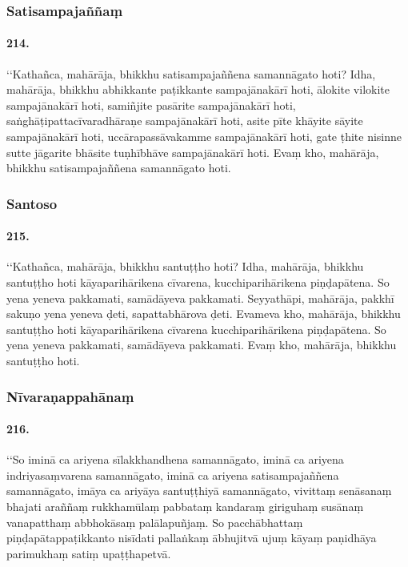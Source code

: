 \subsubsection{Satisampajaññaṃ}

\paragraph{214.} ‘‘Kathañca, mahārāja, bhikkhu satisampajaññena samannāgato hoti? Idha, mahārāja, bhikkhu abhikkante paṭikkante sampajānakārī hoti, ālokite vilokite sampajānakārī hoti, samiñjite pasārite sampajānakārī hoti, saṅghāṭipattacīvaradhāraṇe sampajānakārī hoti, asite pīte khāyite sāyite sampajānakārī hoti, uccārapassāvakamme sampajānakārī hoti, gate ṭhite nisinne sutte jāgarite bhāsite tuṇhībhāve sampajānakārī hoti. Evaṃ kho, mahārāja, bhikkhu satisampajaññena samannāgato hoti.

\subsubsection{Santoso}

\paragraph{215.} ‘‘Kathañca, mahārāja, bhikkhu santuṭṭho hoti? Idha, mahārāja, bhikkhu santuṭṭho hoti kāyaparihārikena cīvarena, kucchiparihārikena piṇḍapātena. So yena yeneva pakkamati, samādāyeva pakkamati. Seyyathāpi, mahārāja, pakkhī sakuṇo yena yeneva ḍeti, sapattabhārova ḍeti. Evameva kho, mahārāja, bhikkhu santuṭṭho hoti kāyaparihārikena cīvarena kucchiparihārikena piṇḍapātena. So yena yeneva pakkamati, samādāyeva pakkamati. Evaṃ kho, mahārāja, bhikkhu santuṭṭho hoti.

\subsubsection{Nīvaraṇappahānaṃ}

\paragraph{216.} ‘‘So iminā ca ariyena sīlakkhandhena samannāgato, iminā ca ariyena indriyasaṃvarena samannāgato, iminā ca ariyena satisampajaññena samannāgato, imāya ca ariyāya santuṭṭhiyā samannāgato, vivittaṃ senāsanaṃ bhajati araññaṃ rukkhamūlaṃ pabbataṃ kandaraṃ giriguhaṃ susānaṃ vanapatthaṃ abbhokāsaṃ palālapuñjaṃ. So pacchābhattaṃ piṇḍapātappaṭikkanto nisīdati pallaṅkaṃ ābhujitvā ujuṃ kāyaṃ paṇidhāya parimukhaṃ satiṃ upaṭṭhapetvā.

